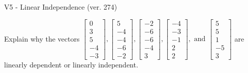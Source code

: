 \begin{exercise}
  \begin{exerciseTitle}V5 - Linear Independence (ver. 274)\end{exerciseTitle}
  \begin{exerciseStatement}
    Explain why the vectors \(\left[\begin{array}{r}
0 \\
3 \\
5 \\
-4 \\
-3
\end{array}\right] , \left[\begin{array}{r}
5 \\
-4 \\
-4 \\
-6 \\
-2
\end{array}\right] , \left[\begin{array}{r}
-2 \\
-6 \\
-6 \\
-4 \\
3
\end{array}\right] , \left[\begin{array}{r}
-4 \\
-3 \\
-1 \\
2 \\
2
\end{array}\right] , \text{ and } \left[\begin{array}{r}
5 \\
5 \\
1 \\
-5 \\
3
\end{array}\right]\) are linearly dependent or linearly independent.	



\end{exerciseStatement}
\end{exercise}
